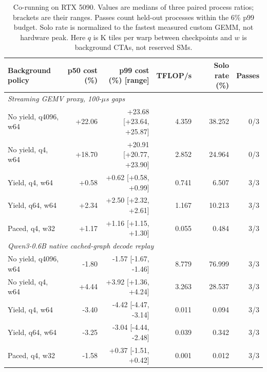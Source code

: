 \begin{table}[t]
\centering\small
\begin{tabular}{lrrrrr}
\toprule
Background policy & p50 cost (\%) & p99 cost (\%) [range] & TFLOP/s & Solo rate (\%) & Passes \\
\midrule
\multicolumn{6}{l}{\textit{Streaming GEMV proxy, 100-$\mu$s gaps}} \\
No yield, q4096, w64 & +22.06 & +23.68 [+23.64, +25.87] & 4.359 & 38.252 & 0/3 \\
No yield, q4, w64 & +18.70 & +20.91 [+20.77, +23.90] & 2.852 & 24.964 & 0/3 \\
Yield, q4, w64 & +0.58 & +0.62 [+0.58, +0.99] & 0.741 & 6.507 & 3/3 \\
Yield, q64, w64 & +2.34 & +2.50 [+2.32, +2.61] & 1.167 & 10.213 & 3/3 \\
Paced, q4, w32 & +1.17 & +1.16 [+1.15, +1.30] & 0.055 & 0.484 & 3/3 \\
\midrule
\multicolumn{6}{l}{\textit{Qwen3-0.6B native cached-graph decode replay}} \\
No yield, q4096, w64 & -1.80 & -1.57 [-1.67, -1.46] & 8.779 & 76.999 & 3/3 \\
No yield, q4, w64 & +4.44 & +3.92 [+1.36, +4.24] & 3.263 & 28.537 & 3/3 \\
Yield, q4, w64 & -3.40 & -4.42 [-4.47, -3.14] & 0.011 & 0.094 & 3/3 \\
Yield, q64, w64 & -3.25 & -3.04 [-4.44, -2.48] & 0.039 & 0.342 & 3/3 \\
Paced, q4, w32 & -1.58 & +0.37 [-1.51, +0.42] & 0.001 & 0.012 & 3/3 \\
\bottomrule
\end{tabular}
\caption{Co-running on RTX 5090. Values are medians of three paired process ratios; brackets are their ranges. Passes count held-out processes within the 6\% p99 budget. Solo rate is normalized to the fastest measured custom GEMM, not hardware peak. Here $q$ is K tiles per warp between checkpoints and $w$ is background CTAs, not reserved SMs.}
\label{tab:slack}
\end{table}
